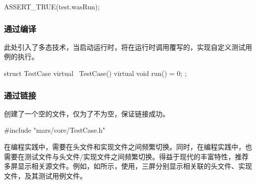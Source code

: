 \begin{content}
\begin{leftbar}
\begin{c++}[caption={\ttfamily{test/mars/core/TestCaseSpec.cc}}]
{  ASSERT_TRUE(test.wasRun);
}
 \end{c++}
\end{leftbar}

\subsubsection{通过编译}

此处引入了多态技术，当启动运行时，将在运行时调用覆写的，实现自定义测试用例的执行。

\begin{leftbar}
 \begin{c++}[caption={\ttfamily{include/mars/core/TestCase.h}}]
struct TestCase {
  virtual ~TestCase() {}
  virtual void run() = 0;
};
  \end{c++}
\end{leftbar}

\subsubsection{通过链接}

创建了一个空的文件，仅为了不为空，保证链接成功。

\begin{leftbar}
 \begin{c++}[caption={\ttfamily{src/mars/core/TestCase.cc}}]
#include "mars/core/TestCase.h"
 \end{c++}
\end{leftbar}

\begin{story}
  \begin{center}
  \end{center}

\begin{content}

在\cpp{}编程实践中，需要在头文件和实现文件之间频繁切换。同时，在编程实践中，也需要在测试文件与头文件/实现文件之间频繁切换。得益于现代的丰富特性，推荐多屏显示相关源文件。例如，如所示，使用，三屏分别显示相关联的头文件、实现文件，及其测试用例文件。


\end{content}
\end{story}
\end{content}
